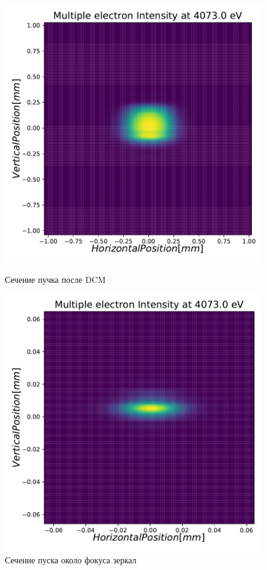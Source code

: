 \begin{figure}[h]
\begin{minipage}{0.3\textwidth}
		\includegraphics[width=\textwidth]{pic/3_harm_after_DCM_2d.pdf}
		\caption{Сечение пучка после DCM}
		\label{fig:3_harm_after_DCM_2d}
	\end{minipage} 
	\begin{minipage}{0.3\textwidth}
		\centering
		\includegraphics[width=\textwidth]{pic/3_harm_after_Sph_Mir_2d.pdf}
		\caption{Сечение пуска около фокуса зеркал}
		\label{fig:3_harm_after_Sph_Mir_2d}
	\end{minipage} 
\end{figure}
